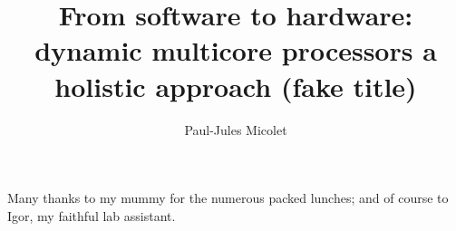 \documentclass[phd,icsa,twoside]{infthesis}
\title{From software to hardware: dynamic multicore processors a holistic approach (fake title)}
\author{Paul-Jules Micolet}
\begin{document}
\begin{preliminary}

\maketitle

\begin{acknowledgements}
Many thanks to my mummy for the numerous packed lunches; and of course to
Igor, my faithful lab assistant.
\end{acknowledgements}

\standarddeclaration


\tableofcontents


\end{preliminary}


\label{chp:bg}




\label{chp3}










\end{document}
